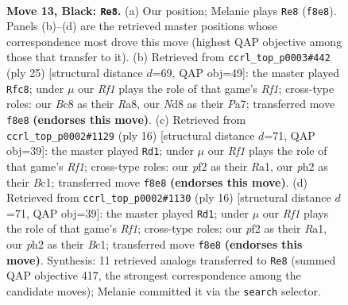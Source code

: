 \documentclass[11pt]{article}
\begin{document}
\clearpage

\begin{figure}[p]\centering
\begin{subfigure}{0.46\textwidth}\centering
\resizebox{\linewidth}{!}{%
\newchessgame
\chessboard[
  setfen={r1bn1rk1/1pppqppp/p4n2/3P4/8/2B1PNP1/PP3PBP/R2Q1R1K b - - 2 13},
  showmover=false,
  pgfstyle=straightmove, color=movearrow, markmove={f8-e8}
]}
\caption{}
\end{subfigure}\hfill
\begin{subfigure}{0.46\textwidth}\centering
\resizebox{\linewidth}{!}{%
\newchessgame
\chessboard[
  setfen={r4rk1/pp1nqppp/3p1n2/3P1b2/4p3/P1B2PPN/1P2P1BP/R2Q1RK1 b - - 0 13},
  showmover=false,
  pgfstyle=straightmove, color=movearrow, markmove={f8-c8}
]}
\caption{}
\end{subfigure}
\\[4pt]
\begin{subfigure}{0.46\textwidth}\centering
\resizebox{\linewidth}{!}{%
\newchessgame
\chessboard[
  setfen={r3kbnr/1ppq2pp/p1p1bp2/4p3/2N1P3/5N2/PPPPQPPP/R1B2RK1 w kq - 2 9},
  showmover=false,
  pgfstyle=straightmove, color=movearrow, markmove={f1-d1}
]}
\caption{}
\end{subfigure}\hfill
\begin{subfigure}{0.46\textwidth}\centering
\resizebox{\linewidth}{!}{%
\newchessgame
\chessboard[
  setfen={r3kbnr/1ppq2pp/p1p1bp2/4p3/2N1P3/5N2/PPPPQPPP/R1B2RK1 w kq - 2 9},
  showmover=false,
  pgfstyle=straightmove, color=movearrow, markmove={f1-d1}
]}
\caption{}
\end{subfigure}
\caption{\textbf{Move 13, Black: \texttt{Re8}.} (a) Our position; Melanie plays \texttt{Re8} (\texttt{f8e8}). Panels (b)--(d) are the retrieved master positions whose correspondence most drove this move (highest QAP objective among those that transfer to it). (b) Retrieved from \texttt{ccrl\_top\_p0003\#442} (ply 25) [structural distance $d$=69, QAP obj=49]: the master played \texttt{Rfc8}; under $\mu$ our \emph{Rf1} plays the role of that game's \emph{Rf1}; cross-type roles: our \emph{B}c8 as their \emph{R}a8, our \emph{N}d8 as their \emph{P}a7; transferred move \texttt{f8e8} \textbf{(endorses this move)}. (c) Retrieved from \texttt{ccrl\_top\_p0002\#1129} (ply 16) [structural distance $d$=71, QAP obj=39]: the master played \texttt{Rd1}; under $\mu$ our \emph{Rf1} plays the role of that game's \emph{Rf1}; cross-type roles: our \emph{p}f2 as their \emph{R}a1, our \emph{p}h2 as their \emph{B}c1; transferred move \texttt{f8e8} \textbf{(endorses this move)}. (d) Retrieved from \texttt{ccrl\_top\_p0002\#1130} (ply 16) [structural distance $d$=71, QAP obj=39]: the master played \texttt{Rd1}; under $\mu$ our \emph{Rf1} plays the role of that game's \emph{Rf1}; cross-type roles: our \emph{p}f2 as their \emph{R}a1, our \emph{p}h2 as their \emph{B}c1; transferred move \texttt{f8e8} \textbf{(endorses this move)}. Synthesis: 11 retrieved analogs transferred to \texttt{Re8} (summed QAP objective 417, the strongest correspondence among the candidate moves); Melanie committed it via the \texttt{search} selector.}
\label{fig:thought-m25}
\end{figure}
\end{document}
